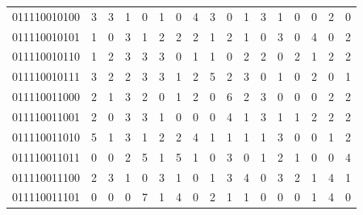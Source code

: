 \documentclass[10pt,a4paper]{article}
\begin{document}
\begin{longtable}{ |c|c|c|c|c|c|c|c|c|c|c|c|c|c|c|c|c| }
    011110010100              & 3                            & 3                                & 1                            & 0                              & 1   & 0   & 4   & 3   & 0   & 1   & 3   & 1   & 0   & 0   & 2   & 0   \\
    011110010101              & 1                            & 0                                & 3                            & 1                              & 2   & 2   & 2   & 1   & 2   & 1   & 0   & 3   & 0   & 4   & 0   & 2   \\
    011110010110              & 1                            & 2                                & 3                            & 3                              & 3   & 0   & 1   & 1   & 0   & 2   & 2   & 0   & 2   & 1   & 2   & 2   \\
    011110010111              & 3                            & 2                                & 2                            & 3                              & 3   & 1   & 2   & 5   & 2   & 3   & 0   & 1   & 0   & 2   & 0   & 1   \\
    011110011000              & 2                            & 1                                & 3                            & 2                              & 0   & 1   & 2   & 0   & 6   & 2   & 3   & 0   & 0   & 0   & 2   & 2   \\
    011110011001              & 2                            & 0                                & 3                            & 3                              & 1   & 0   & 0   & 0   & 4   & 1   & 3   & 1   & 1   & 2   & 2   & 2   \\
    011110011010              & 5                            & 1                                & 3                            & 1                              & 2   & 2   & 4   & 1   & 1   & 1   & 1   & 3   & 0   & 0   & 1   & 2   \\
    011110011011              & 0                            & 0                                & 2                            & 5                              & 1   & 5   & 1   & 0   & 3   & 0   & 1   & 2   & 1   & 0   & 0   & 4   \\
    011110011100              & 2                            & 3                                & 1                            & 0                              & 3   & 1   & 0   & 1   & 3   & 4   & 0   & 3   & 2   & 1   & 4   & 1   \\
    011110011101              & 0                            & 0                                & 0                            & 7                              & 1   & 4   & 0   & 2   & 1   & 1   & 0   & 0   & 0   & 1   & 4   & 0   \\

\end{longtable}
\end{document}
